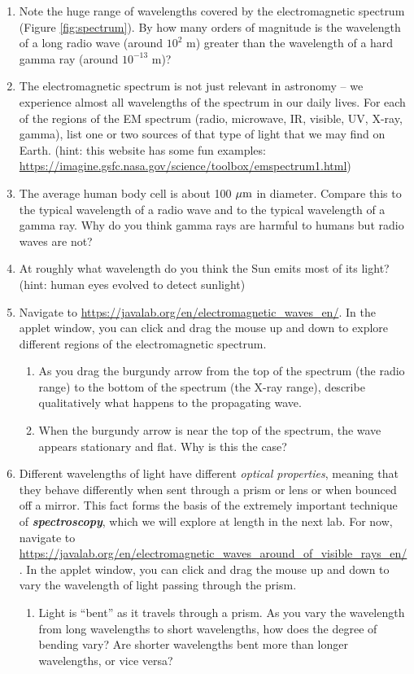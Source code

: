 \documentclass[11pt]{article}
\begin{document}
\begin{enumerate}
    \item Note the huge range of wavelengths covered by the electromagnetic spectrum (Figure \ref{fig:spectrum}). By how many orders of magnitude is the wavelength of a long radio wave (around $10^2$ m) greater than the wavelength of a hard gamma ray (around $10^{-13}$ m)? 
    
    \item The electromagnetic spectrum is not just relevant in astronomy -- we experience almost all wavelengths of the spectrum in our daily lives. For each of the regions of the EM spectrum (radio, microwave, IR, visible, UV, X-ray, gamma), list one or two sources of that type of light that we may find on Earth. (hint: this website has some fun examples: \url{https://imagine.gsfc.nasa.gov/science/toolbox/emspectrum1.html})
    
    \item The average human body cell is about 100 $\rm \mu  m$ in diameter. Compare this to the typical wavelength of a radio wave and to the typical wavelength of a gamma ray. Why do you think gamma rays are harmful to humans but radio waves are not?
    
    \item At roughly what wavelength do you think the Sun emits most of its light? (hint: human eyes evolved to detect sunlight)
    
    \item Navigate to \url{https://javalab.org/en/electromagnetic_waves_en/}. In the applet window, you can click and drag the mouse up and down to explore different regions of the electromagnetic spectrum.
    \begin{enumerate}
        \item As you drag the burgundy arrow from the top of the spectrum (the radio range) to the bottom of the spectrum (the X-ray range), describe qualitatively what happens to the propagating wave.
        
        \item When the burgundy arrow is near the top of the spectrum, the wave appears stationary and flat. Why is this the case?
    \end{enumerate}
    
    \item Different wavelengths of light have different \emph{optical properties}, meaning that they behave differently when sent through a prism or lens or when bounced off a mirror. This fact forms the basis of the extremely important technique of \textbf{\emph{spectroscopy}}, which we will explore at length in the next lab. For now, navigate to \url{https://javalab.org/en/electromagnetic_waves_around_of_visible_rays_en/}. In the applet window, you can click and drag the mouse up and down to vary the wavelength of light passing through the prism.
    \begin{enumerate}
        \item Light is ``bent'' as it travels through a prism. As you vary the wavelength from long wavelengths to short wavelengths, how does the degree of bending vary? Are shorter wavelengths bent more than longer wavelengths, or vice versa?
        

\end{enumerate}
\end{enumerate}
\end{document}
